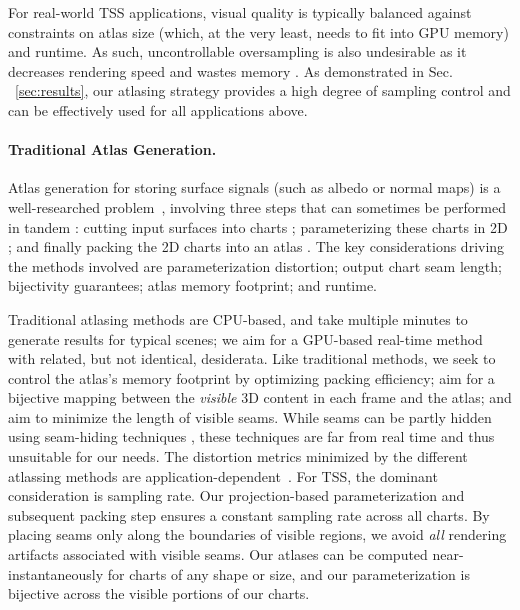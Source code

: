 For real-world TSS applications, visual quality is typically balanced against constraints on atlas size (which, at the very least, needs to fit into GPU memory) and runtime. 
As such, uncontrollable oversampling is also undesirable as it decreases rendering speed and wastes memory \cite{hillesland2016texel}.
As demonstrated in Sec. ~\ref{sec:results}, our atlasing strategy provides a high degree of sampling control and can be effectively used for all applications above.

\paragraph*{Traditional Atlas Generation.}
Atlas generation for storing surface signals (such as albedo or normal maps) is a well-researched problem~\cite{sheffer2007mesh}, involving three steps that can sometimes be performed in tandem \cite{BoundedDistortParam:2002,Li:2018:OptCuts}: cutting input surfaces into charts \cite{julius2005d,zhou2004iso}; parameterizing these charts in 2D \cite{levy2002least,sheffer2005abf++,jiang2017simplicial}; and finally packing the 2D charts into an atlas \cite{levy2002least,Limper18BoxCutter,igarashi2001adaptive,liu2019atlas}. The key considerations driving the methods involved are parameterization distortion; output chart seam length; bijectivity guarantees; atlas memory footprint; and runtime.
 
Traditional atlasing methods are CPU-based, and take multiple minutes to generate results for typical scenes; we aim for a GPU-based real-time method with related, but not identical, desiderata. Like traditional methods, we seek to control the atlas's memory footprint by optimizing packing efficiency; aim for a bijective mapping between the {\em visible} 3D content in each frame and the atlas; and aim to minimize the length of visible seams.  While seams can be partly hidden using seam-hiding techniques \cite{liu2017seamless,Ray2010invisible}, these techniques are far from real time and thus unsuitable for our needs. The distortion metrics minimized by the different atlassing methods are application-dependent~\cite{sheffer2007mesh,sander2002signal,sander2001texture}. For TSS, the dominant consideration is sampling rate. Our projection-based parameterization and subsequent packing step ensures a constant sampling rate across all charts. By placing seams only along the boundaries of visible regions, we avoid {\em all} rendering artifacts associated with visible seams. Our atlases can be computed near-instantaneously for charts of any shape or size, and our parameterization is bijective across the visible portions of our charts.

